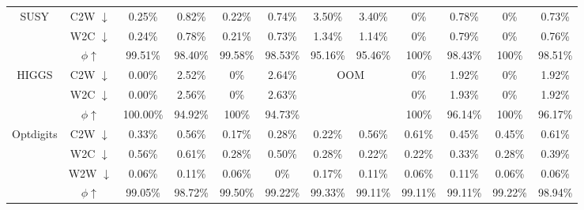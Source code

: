 \begin{table}[t]
{\begin{tabular}{c|c|cc|cc|cc|cc|cc}
\multirow{3}{*}{SUSY}                        & C2W $\downarrow$                    & 0.25\%      & 0.82\%      & 0.22\%     & 0.74\%      & 3.50\%             & 3.40\%              & 0\%          & 0.78\%        & 0\%        & 0.73\%      \\
                                             & W2C $\downarrow$                    & 0.24\%      & 0.78\%      & 0.21\%     & 0.73\%      & 1.34\%             & 1.14\%              & 0\%          & 0.79\%        & 0\%        & 0.76\%      \\
                                             & $\phi \uparrow$                  & 99.51\%     & 98.40\%     & 99.58\%    & 98.53\%     & 95.16\%            & 95.46\%             & 100\%        & 98.43\%       & 100\%      & 98.51\%     \\\midrule
\multirow{3}{*}{HIGGS}                       & C2W $\downarrow$                    & 0.00\%      & 2.52\%      & 0\%        & 2.64\%      & \multicolumn{2}{c|}{\multirow{3}{*}{OOM}} & 0\%          & 1.92\%        & 0\%        & 1.92\%      \\
                                             & W2C $\downarrow$                    & 0.00\%      & 2.56\%      & 0\%        & 2.63\%      & \multicolumn{2}{c|}{}                     & 0\%          & 1.93\%        & 0\%        & 1.92\%      \\
                                             & $\phi \uparrow$                  & 100.00\%    & 94.92\%     & 100\%      & 94.73\%     & \multicolumn{2}{c|}{}                     & 100\%        & 96.14\%       & 100\%      & 96.17\%     \\\midrule
\multirow{4}{*}{Optdigits}                   & C2W $\downarrow$                    & 0.33\%      & 0.56\%      & 0.17\%     & 0.28\%      & 0.22\%             & 0.56\%              & 0.61\%       & 0.45\%        & 0.45\%     & 0.61\%      \\
                                             & W2C $\downarrow$                    & 0.56\%      & 0.61\%      & 0.28\%     & 0.50\%      & 0.28\%             & 0.22\%              & 0.22\%       & 0.33\%        & 0.28\%     & 0.39\%      \\
                                             & W2W $\downarrow$                    & 0.06\%      & 0.11\%      & 0.06\%     & 0\%         & 0.17\%             & 0.11\%              & 0.06\%       & 0.11\%        & 0.06\%     & 0.06\%      \\
                                             & $\phi \uparrow$                  & 99.05\%     & 98.72\%     & 99.50\%    & 99.22\%     & 99.33\%            & 99.11\%             & 99.11\%      & 99.11\%       & 99.22\%    & 98.94\%     \\\midrule

\end{tabular}}
\end{table}
